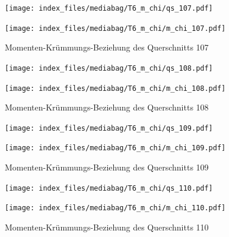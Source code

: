 \documentclass[
  11pt,
  letterpaper,
]{scrreprt}
\begin{document}
\begin{figure}[H]

\begin{minipage}{0.50\linewidth}
\texttt{[image: index\_files/mediabag/T6\_m\_chi/qs\_107.pdf]}\end{minipage}%
%
\begin{minipage}{0.50\linewidth}
\texttt{[image: index\_files/mediabag/T6\_m\_chi/m\_chi\_107.pdf]}\end{minipage}%

\caption{\label{fig-m_chi_appendix}Momenten-Krümmungs-Beziehung des
Querschnitts 107}

\end{figure}%

\begin{figure}[H]

\begin{minipage}{0.50\linewidth}
\texttt{[image: index\_files/mediabag/T6\_m\_chi/qs\_108.pdf]}\end{minipage}%
%
\begin{minipage}{0.50\linewidth}
\texttt{[image: index\_files/mediabag/T6\_m\_chi/m\_chi\_108.pdf]}\end{minipage}%

\caption{\label{fig-m_chi_appendix}Momenten-Krümmungs-Beziehung des
Querschnitts 108}

\end{figure}%

\begin{figure}[H]

\begin{minipage}{0.50\linewidth}
\texttt{[image: index\_files/mediabag/T6\_m\_chi/qs\_109.pdf]}\end{minipage}%
%
\begin{minipage}{0.50\linewidth}
\texttt{[image: index\_files/mediabag/T6\_m\_chi/m\_chi\_109.pdf]}\end{minipage}%

\caption{\label{fig-m_chi_appendix}Momenten-Krümmungs-Beziehung des
Querschnitts 109}

\end{figure}%

\begin{figure}[H]

\begin{minipage}{0.50\linewidth}
\texttt{[image: index\_files/mediabag/T6\_m\_chi/qs\_110.pdf]}\end{minipage}%
%
\begin{minipage}{0.50\linewidth}
\texttt{[image: index\_files/mediabag/T6\_m\_chi/m\_chi\_110.pdf]}\end{minipage}%

\caption{\label{fig-m_chi_appendix}Momenten-Krümmungs-Beziehung des
Querschnitts 110}

\end{figure}%
\end{document}
